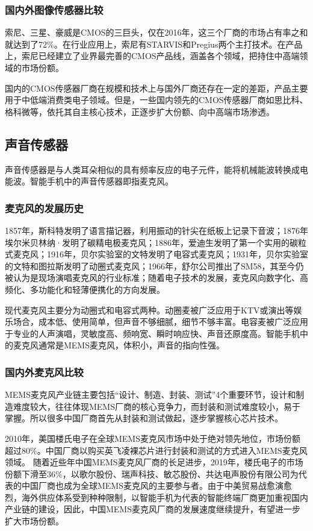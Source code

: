 \documentclass[lang=cn]{elegantpaper}
\begin{document}
\subsubsection{国内外图像传感器比较}

索尼、三星、豪威是CMOS的三巨头，仅在2016年，这三个厂商的市场占有率之和就达到了72\%。在行业应用上，索尼有STARVIS和Pregius两个主打技术。在产品上，索尼已经建立了业界最完善的CMOS产品线，涵盖各个领域，把持住中高端领域的市场份额。

国内的CMOS传感器厂商在规模和技术上与国外厂商还存在一定的差距，产品主要用于中低端消费类电子领域。但是，一些国内领先的CMOS传感器厂商如思比科、格科微等，依托其自主核心技术，正逐步扩大份额、向中高端市场渗透。

\subsection{声音传感器}

声音传感器是与人类耳朵相似的具有频率反应的电子元件，能将机械能波转换成电能波。智能手机中的声音传感器即指麦克风。

\subsubsection{麦克风的发展历史}

1857年，斯科特发明了语言描记器，利用振动的针尖在纸板上记录下音波；1876年埃尔米贝林纳·发明了碳精电极麦克风；1886年，爱迪生发明了第一个实用的碳粒式麦克风；1916年，贝尔实验室的文特发明了电容式麦克风；1931年，贝尔实验室的文特和图拉斯发明了动圈式麦克风；1966年，舒尔公司推出了SM58，其至今仍被认为是现场演唱麦克风的行业标准；随着电子技术的发展，麦克风向数字化、高频化、多功能化和轻薄便携化的方向发展。

现代麦克风主要分为动圈式和电容式两种。动圈麦被广泛应用于KTV或演出等娱乐场合，成本低、使用简单，但声音不够细腻，细节不够丰富。电容麦被广泛应用于专业的人声演唱，灵敏度高、频响宽、瞬时响应快、声音还原度高。智能手机中的麦克风通常是MEMS麦克风，体积小，声音的指向性强。

\subsubsection{国内外麦克风比较}


MEMS麦克风产业链主要包括“设计、制造、封装、测试”4个重要环节，设计和制造难度较大，往往体现MEMS厂商的核心竞争力，而封装和测试难度较小，易于掌握。所以很多中国厂商首先从封装和测试做起，逐步掌握核心芯片技术。

2010年，美国楼氏电子在全球MEMS麦克风市场中处于绝对领先地位，市场份额超过80\%。中国厂商以购买英飞凌裸芯片进行封装和测试的方式进入MEMS麦克风领域。 随着近些年中国MEMS麦克风厂商的长足进步，2019年，楼氏电子的市场份额下滑至36\%，以歌尔股份、瑞声科技、敏芯股份、共达电声股份有限公司为代表的中国厂商也成为全球MEMS麦克风的主要参与者。由于中美贸易战愈演愈烈，海外供应体系受到种种限制，以智能手机为代表的智能终端厂商更加重视国内产业链的建设，因此，中国MEMS麦克风厂商的发展速度继续提升，有望进一步扩大市场份额。
\end{document}
